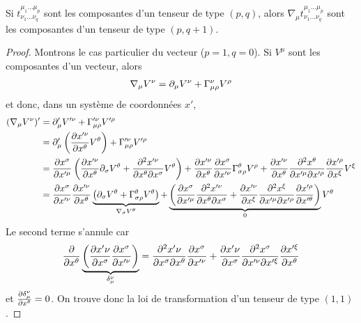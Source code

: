 \documentclass[a4paper,11pt]{report}
\begin{document}
                \begin{thm}\begin{leftbar}
                    Si $t^{\mu_1\dots\mu_p}_{\nu_1\dots\nu_q}$ sont les composantes d'un tenseur de type $(p,q)$, alors $\nabla_\mu t^{\mu_1\dots\mu_p}_{\nu_1\dots\nu_q}$ sont les composantes d'un tenseur de type $(p,q+1)$.
                \end{leftbar}\end{thm}
                
                \begin{proof}
                    Montrons le cas particulier du vecteur ($p=1,q=0$). Si $V^\mu$ sont les composantes d'un vecteur, alors
                    \begin{equation}
                        \nabla_\mu V^\nu = \partial_\mu V^\nu + \Gamma^\nu_{\mu\rho} V^\rho
                    \end{equation}
                    et donc, dans un système de coordonnées $x'$, 
                    \begin{align}
                        (\nabla_\mu V^\nu)' &= \partial'_\mu V'^\nu + \Gamma'^\nu_{\mu\rho} V'^\rho \\
                        &= \partial'_\mu\left( \pdv{x'^\nu}{x^\theta} V^\theta\right) + \Gamma'^\nu_{\mu\rho} V'^\rho\\
                        &= \pdv{x^\sigma}{x'^\mu}\left( \pdv{x'^\nu}{x^\theta}\partial_\sigma V^\theta + \pdv{x'^\nu}{x^\theta}{x^\sigma} V^\theta \right) + \pdv{x'^\nu}{x^\theta}\pdv{x^\sigma}{x'^\nu}\Gamma^\theta_{\sigma\rho} V^\rho + \pdv{x'^\nu}{x^\theta}\pdv{x^\theta}{x'^\mu}{x'^\rho}\pdv{x'^\rho}{x^\xi} V^\xi\\
                        &=  \pdv{x^\sigma}{x'^\nu} \pdv{x'^\nu}{x^\theta}\underbrace{\left(\partial_\sigma V^\theta + \Gamma^\theta_{\sigma\rho} V^\theta \right)}_{\nabla_\sigma V^\theta}+\underbrace{\left( \pdv{x^\sigma}{x'^\mu}\pdv{x'^\nu}{x^\theta}{x^\sigma}+\pdv{x'^\nu}{x^\xi}\pdv{x^\xi}{x'^\mu}{x'^\rho}\pdv{x'^\rho}{x'^\theta} \right)}_{0}V^\theta
                    \end{align}
                    Le second terme s'annule car
                    \begin{equation}
                        \pdv{}{x^\theta}\underbrace{\left( \pdv{x'\nu}{x^\sigma}\pdv{x^\sigma}{x'^\nu} \right)}_{\delta^\nu_\mu} = \pdv{x'\nu}{x^\sigma}{x^\theta}\pdv{x^\sigma}{x'^\nu} + \pdv{x'\nu}{x^\sigma}\pdv{x^\sigma}{x'^\nu}{x'^\xi}\pdv{x'^\xi}{x^\theta}
                    \end{equation}
                    et $ \pdv{\delta^\nu_\mu}{x^\theta} = 0$. On trouve donc la loi de transformation d'un tenseur de type $(1,1)$.
                \end{proof}
                
\end{document}
